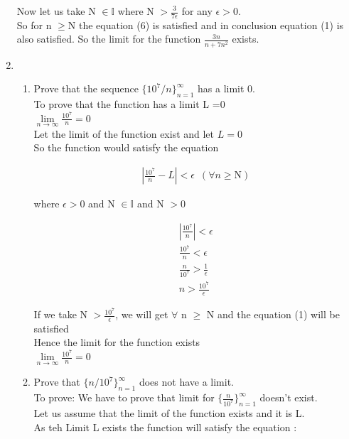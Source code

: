 \documentclass[11pt, letterpaper]{article}
\begin{document}
\begin{enumerate}
{\begin{enumerate}
{\begin{center}
				Now let us take N $\in \mathbb{I}$ where N $> \frac{3}{7\epsilon}$ for any $\epsilon > 0$.\\
				So for n $\geq \mathrm{N}$ the equation (6) is satisfied and in conclusion equation (1) is also satisfied. So the limit for the function $\frac{3n}{n + 7n^2}$ exists.
			\end{center}
			}
		\end{enumerate}			
	}
	
	\item{\begin{enumerate}
		\item{Prove that the sequence $\lbrace 10^7/n \rbrace_{n=1}^\infty$ has a limit 0.\\
		To prove that the function has a limit L =0\\
		$\lim \limits_{n \to \infty} \frac{10^7}{n} = 0$\\
		Let the limit of the function exist and let $L =0$\\
		So the function would satisfy the equation\\
		\setcounter{equation}{0}

		\begin{eqnarray}
			\left| \frac{10^7}{n} - L \right| < \epsilon \,\,\, (\forall n \geq \mathrm{N})
		\end{eqnarray}				

		\begin{center}
			where $\epsilon > 0$ and N $\in \mathbb{I}$ and N $>0$
		\end{center} 
		
		\begin{eqnarray}
			\left| \frac{10^7}{n}\right| < \epsilon \\
			\frac{10^7}{n} < \epsilon \nonumber \\
			\frac{n}{10^7} > \frac{1}{\epsilon} \nonumber \\
			n > \frac{10^7}{\epsilon} 			
		\end{eqnarray}
		
		If we take N $> \frac{10^7}{\epsilon}$, we will get $\forall$ n $\geq$ N and the equation (1) will be satisfied\\
		Hence the limit for the function exists\\
		$\lim \limits_{n \to \infty} \frac{10^7}{n} = 0$
		}
		
		\item{Prove that $\lbrace n/10^7 \rbrace_{n=1}^\infty$ does not have a limit.\\
			To prove: We have to prove that limit for $ \lbrace \frac{n}{10^7} \rbrace_{n=1}^\infty $ doesn't exist.\\
			Let us assume that the limit of the function exists and it is L.\\
			As teh Limit L exists the function will satisfy the equation :\\
			
}
\end{enumerate}}
\end{enumerate}
\end{document}
